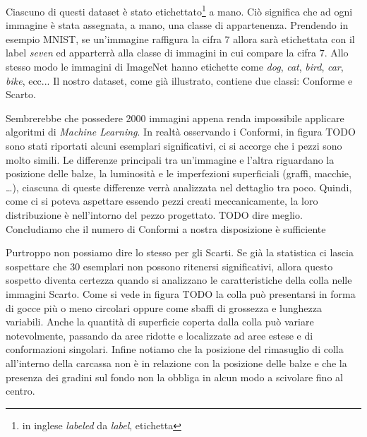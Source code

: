Ciascuno di questi dataset è stato etichettato\footnote{in inglese \textit{labeled} da \textit{label}, etichetta} a mano.
Ciò significa che ad ogni immagine è stata assegnata, a mano, una classe di appartenenza.
Prendendo in esempio MNIST, se un'immagine raffigura la cifra $7$ allora sarà etichettata con il label \textit{seven} ed apparterrà alla classe di immagini in cui compare la cifra $7$.
Allo stesso modo le immagini di ImageNet hanno etichette come \textit{dog}, \textit{cat}, \textit{bird}, \textit{car}, \textit{bike}, ecc... %
Il nostro dataset, come già illustrato, contiene due classi: Conforme e Scarto.

Sembrerebbe che possedere 2000 immagini appena renda impossibile applicare algoritmi di \textit{Machine Learning}.
In realtà osservando i Conformi, in figura TODO sono stati riportati alcuni esemplari significativi, ci si accorge che i pezzi sono molto simili.
Le differenze principali tra un'immagine e l'altra riguardano la posizione delle balze, la luminosità e le imperfezioni superficiali (graffi, macchie, \dots), ciascuna di queste differenze verrà analizzata nel dettaglio tra poco.
Quindi, come ci si poteva aspettare essendo pezzi creati meccanicamente, la loro distribuzione è nell'intorno del pezzo progettato. TODO dire meglio.
Concludiamo che il numero di Conformi a nostra disposizione è sufficiente

Purtroppo non possiamo dire lo stesso per gli Scarti.
Se già la statistica ci lascia sospettare che $30$ esemplari non possono ritenersi significativi, allora questo sospetto diventa certezza quando si analizzano le caratteristiche della colla nelle immagini Scarto.  
Come si vede in figura TODO
la colla può presentarsi in forma di gocce più o meno circolari oppure come sbaffi di grossezza e lunghezza variabili.
Anche la quantità di superficie coperta dalla colla può variare notevolmente, passando da aree ridotte e localizzate ad aree estese e di conformazioni singolari.
Infine notiamo che la posizione del rimasuglio di colla all'interno della carcassa non è in relazione con la posizione delle balze e che la presenza dei gradini sul fondo non la obbliga in alcun modo a scivolare fino al centro.

